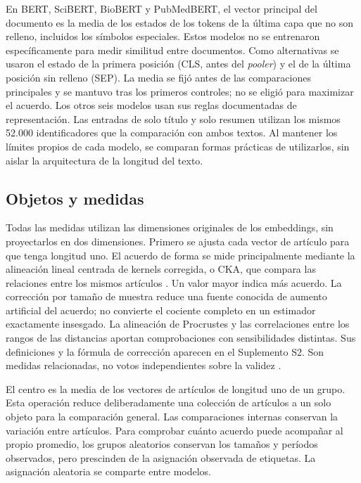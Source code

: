 \documentclass[12pt]{article}
\begin{document}
En BERT, SciBERT, BioBERT y PubMedBERT, el vector principal del documento es la media de los estados de los tokens de la última capa que no son relleno, incluidos los símbolos especiales. Estos modelos no se entrenaron específicamente para medir similitud entre documentos. Como alternativas se usaron el estado de la primera posición (CLS, antes del \emph{pooler}) y el de la última posición sin relleno (SEP). La media se fijó antes de las comparaciones principales y se mantuvo tras los primeros controles; no se eligió para maximizar el acuerdo. Los otros seis modelos usan sus reglas documentadas de representación. Las entradas de solo título y solo resumen utilizan los mismos 52.000 identificadores que la comparación con ambos textos. Al mantener los límites propios de cada modelo, se comparan formas prácticas de utilizarlos, sin aislar la arquitectura de la longitud del texto.


\subsection{Objetos y medidas}
Todas las medidas utilizan las dimensiones originales de los embeddings, sin proyectarlos en dos dimensiones. Primero se ajusta cada vector de artículo para que tenga longitud uno. El acuerdo de forma se mide principalmente mediante la alineación lineal centrada de kernels corregida, o CKA, que compara las relaciones entre los mismos artículos \citep{pmlr-v97-kornblith19a,refa961d84a4e}. Un valor mayor indica más acuerdo. La corrección por tamaño de muestra reduce una fuente conocida de aumento artificial del acuerdo; no convierte el cociente completo en un estimador exactamente insesgado. La alineación de Procrustes y las correlaciones entre los rangos de las distancias aportan comprobaciones con sensibilidades distintas. Sus definiciones y la fórmula de corrección aparecen en el Suplemento S2. Son medidas relacionadas, no votos independientes sobre la validez \citep{NEURIPS2021_252a3dba,pmlr-v285-williams24a}.

El centro es la media de los vectores de artículos de longitud uno de un grupo. Esta operación reduce deliberadamente una colección de artículos a un solo objeto para la comparación general. Las comparaciones internas conservan la variación entre artículos. Para comprobar cuánto acuerdo puede acompañar al propio promedio, los grupos aleatorios conservan los tamaños y períodos observados, pero prescinden de la asignación observada de etiquetas. La asignación aleatoria se comparte entre modelos.
\end{document}
